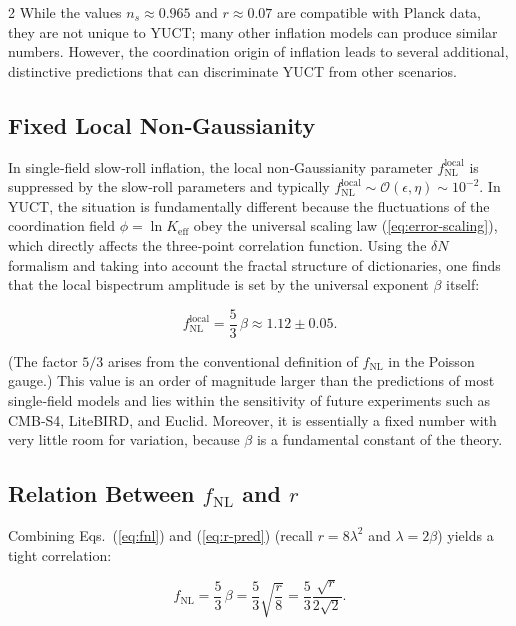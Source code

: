 \documentclass[12pt,a4paper]{article}
\newcommand{\Keff}{K_{\mathrm{eff}}}
\begin{document}
\begin{multicols}{2}
		While the values \(n_s \approx 0.965\) and \(r \approx 0.07\) are compatible with Planck data, they are not unique to YUCT; many other inflation models can produce similar numbers. However, the coordination origin of inflation leads to several additional, distinctive predictions that can discriminate YUCT from other scenarios.
		
		\subsection{Fixed Local Non‑Gaussianity}
		
		In single‑field slow‑roll inflation, the local non‑Gaussianity parameter \(f_{\text{NL}}^{\text{local}}\) is suppressed by the slow‑roll parameters and typically \(f_{\text{NL}}^{\text{local}} \sim \mathcal{O}(\epsilon, \eta) \sim 10^{-2}\). In YUCT, the situation is fundamentally different because the fluctuations of the coordination field \(\phi = \ln \Keff\) obey the universal scaling law (\ref{eq:error-scaling}), which directly affects the three‑point correlation function. Using the \(\delta N\) formalism and taking into account the fractal structure of dictionaries, one finds that the local bispectrum amplitude is set by the universal exponent \(\beta\) itself:
		
		\begin{equation}
			f_{\text{NL}}^{\text{local}} = \frac{5}{3}\,\beta \approx 1.12 \pm 0.05.
			\label{eq:fnl}
		\end{equation}
		
		(The factor \(5/3\) arises from the conventional definition of \(f_{\text{NL}}\) in the Poisson gauge.) This value is an order of magnitude larger than the predictions of most single‑field models and lies within the sensitivity of future experiments such as CMB‑S4, LiteBIRD, and Euclid. Moreover, it is essentially a fixed number with very little room for variation, because \(\beta\) is a fundamental constant of the theory.
		
		\subsection{Relation Between \(f_{\text{NL}}\) and \(r\)}
		
		Combining Eqs.~(\ref{eq:fnl}) and (\ref{eq:r-pred}) (recall \(r = 8\lambda^2\) and \(\lambda = 2\beta\)) yields a tight correlation:
		
		\begin{equation}
			f_{\text{NL}} = \frac{5}{3}\,\beta = \frac{5}{3}\sqrt{\frac{r}{8}} = \frac{5}{3}\frac{\sqrt{r}}{2\sqrt{2}}.
			\label{eq:fnl-r}
		\end{equation}
		

\end{multicols}
\end{document}
